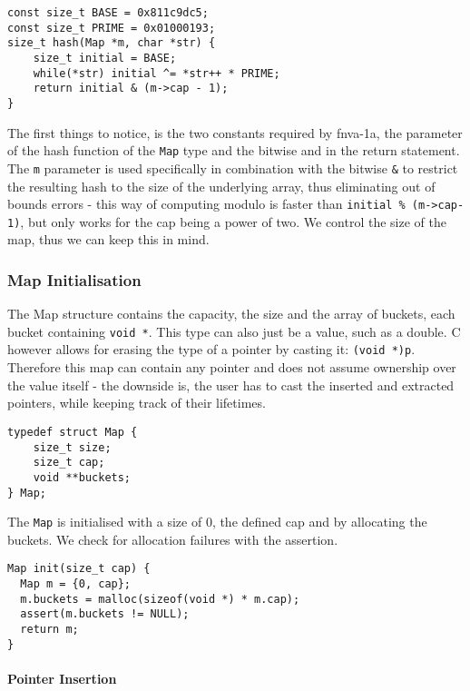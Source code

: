     \begin{verbatim}
const size_t BASE = 0x811c9dc5;
const size_t PRIME = 0x01000193;
size_t hash(Map *m, char *str) {
    size_t initial = BASE;
    while(*str) initial ^= *str++ * PRIME;
    return initial & (m->cap - 1);
}
    \end{verbatim}

    The first things to notice, is the two constants required by
    fnva-1a, the parameter of the hash function of the \texttt{Map}
    type and the bitwise and in the return statement. The \texttt{m}
    parameter is used specifically in combination with the bitwise
    \texttt{\&} to restrict the resulting hash to the size of the
    underlying array, thus eliminating out of bounds errors - this way
    of computing modulo is faster than \texttt{initial \% (m->cap-1)},
    but only works for the cap being a power of two. We
    control the size of the map, thus we can keep this in mind.
    \subsubsection*{Map Initialisation}

    The Map structure contains the capacity, the size and the array of buckets,
    each bucket containing \texttt{void *}. This type can also just be a
    value, such as a double. C however allows for erasing the type of a pointer
    by casting it: \texttt{(void *)p}. Therefore this map can contain
    any pointer and does not assume ownership over the value itself - the
    downside is, the user has to cast the inserted and extracted pointers,
    while keeping track of their lifetimes.

    \begin{verbatim}
typedef struct Map { 
    size_t size;
    size_t cap;
    void **buckets; 
} Map;
    \end{verbatim}

    The \texttt{Map} is initialised with a size of $0$, the defined cap and by
    allocating the buckets. We check for allocation failures with the
    assertion.

    \begin{verbatim}
Map init(size_t cap) {
  Map m = {0, cap};
  m.buckets = malloc(sizeof(void *) * m.cap);
  assert(m.buckets != NULL);
  return m;
}
    \end{verbatim}
    \paragraph*{Pointer Insertion}

